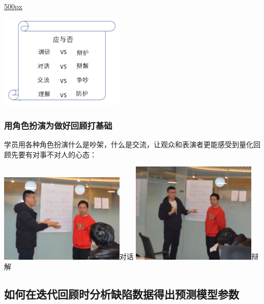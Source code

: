 \href{文件:_游戏1应与否1.png}{500px}

\includegraphics[width=6cm]{游戏1应与否1.png}

\hypertarget{ux7528ux89d2ux8272ux626eux6f14ux4e3aux505aux597dux56deux987eux6253ux57faux7840}{%
\subsubsection{用角色扮演为做好回顾打基础}\label{ux7528ux89d2ux8272ux626eux6f14ux4e3aux505aux597dux56deux987eux6253ux57faux7840}}

学员用各种角色扮演什么是吵架，什么是交流，让观众和表演者更能感受到量化回顾先要有对事不对人的心态：



\includegraphics[width=6cm]{1498.png}\textbar{}对话 \includegraphics[width=6cm]{1499.png}\textbar{}辩解

\hypertarget{ux5982ux4f55ux5728ux8fedux4ee3ux56deux987eux65f6ux5206ux6790ux7f3aux9677ux6570ux636eux5f97ux51faux9884ux6d4bux6a21ux578bux53c2ux6570}{%
\subsection{如何在迭代回顾时分析缺陷数据得出预测模型参数}\label{ux5982ux4f55ux5728ux8fedux4ee3ux56deux987eux65f6ux5206ux6790ux7f3aux9677ux6570ux636eux5f97ux51faux9884ux6d4bux6a21ux578bux53c2ux6570}}

